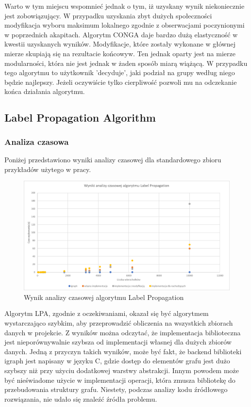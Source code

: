 \documentclass{article}
\begin{document}
Warto w tym miejscu wspomnieć jednak o tym, iż uzyskany wynik niekoniecznie jest zobowiązujący. W przypadku uzyskania zbyt dużych społeczności modyfikacja wyboru maksimum lokalnego zgodnie z obserwacjami poczynionymi w poprzednich akapitach. Algorytm CONGA daje bardzo dużą elastyczność w kwestii uzyskanych wyników. Modyfikacje, które zostały wykonane w głównej mierze skupiają się na rezultacie końcowyw. Ten jednak oparty jest na mierze modularności, która nie jest jednak w żaden sposób miarą wiążącą. W przypadku tego algorytmu to użytkownik 'decyduje', jaki podział na grupy według niego będzie najlepszy. Jeżeli oczywiście tylko cierpliwość pozwoli mu na odczekanie końca działania algorytmu.

\subsection{Label Propagation Algorithm}
\subsubsection{Analiza czasowa}
Poniżej przedstawiono wyniki analizy czasowej dla standardowego zbioru przykładów użytego w pracy.

\begin{figure}[H]
\centering
\includegraphics[width=\textwidth]{images/ms-lpa-benchmark.png}
\caption{Wynik analizy czasowej algorytmu Label Propagation}
\end{figure}

Algorytm LPA, zgodnie z oczekiwaniami, okazał się być algorytmem wystarczająco szybkim, aby przeprowadzić obliczenia na wszystkich zbiorach danych w projekcie. Z wyników można odczytać, że implementacja biblioteczna jest nieporównywalnie szybsza od implementacji własnej dla dużych zbiorów danych. Jedną z przyczyn takich wyników, może być fakt, że backend biblioteki igraph jest napisany w języku C, gdzie dostęp do elementów grafu jest dużo szybszy niż przy użyciu dodatkowej warstwy abstrakcji. Innym powodem może być nieświadome użycie w implementacji operacji, która zmusza bibliotekę do przebudowania struktury grafu. Niestety, podczas analizy kodu źródłowego rozwiązania, nie udało się znaleźć źródła problemu.\\
\end{document}
